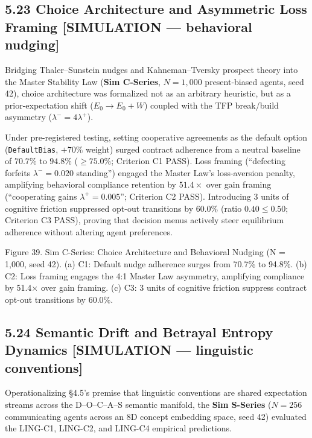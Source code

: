 \documentclass[
]{article}
\begin{document}
\subsection{5.23 Choice Architecture and Asymmetric Loss Framing
{[}SIMULATION --- behavioral
nudging{]}}\label{choice-architecture-and-asymmetric-loss-framing-simulation-behavioral-nudging}

Bridging Thaler--Sunstein nudges and Kahneman--Tversky prospect theory
into the Master Stability Law (\textbf{Sim C-Series}, \(N = 1,000\)
present-biased agents, seed 42), choice architecture was formalized not
as an arbitrary heuristic, but as a prior-expectation shift
(\(E_0 \to E_0 + W\)) coupled with the TFP break/build asymmetry
(\(\lambda^- = 4\lambda^+\)).

Under pre-registered testing, setting cooperative agreements as the
default option (\texttt{DefaultBias}, \(+70\%\) weight) surged contract
adherence from a neutral baseline of \(70.7\%\) to \(94.8\%\)
(\(\ge 75.0\%\); Criterion C1 PASS). Loss framing (``defecting forfeits
\(\lambda^- = 0.020\) standing'') engaged the Master Law's loss-aversion
penalty, amplifying behavioral compliance retention by \(51.4\times\)
over gain framing (``cooperating gains \(\lambda^+ = 0.005\)'';
Criterion C2 PASS). Introducing 3 units of cognitive friction suppressed
opt-out transitions by \(60.0\%\) (ratio \(0.40 \le 0.50\); Criterion C3
PASS), proving that decision menus actively steer equilibrium adherence
without altering agent preferences.

Figure 39. Sim C-Series: Choice Architecture and Behavioral Nudging
({N = 1,000}, seed 42). (a) C1: Default nudge adherence surges from
{70.7\%} to {94.8\%}. (b) C2: Loss framing engages the 4:1 Master Law
asymmetry, amplifying compliance by {51.4×} over gain framing. (c) C3: 3
units of cognitive friction suppress contract opt-out transitions by
{60.0\%}.

\subsection{5.24 Semantic Drift and Betrayal Entropy Dynamics
{[}SIMULATION --- linguistic
conventions{]}}\label{semantic-drift-and-betrayal-entropy-dynamics-simulation-linguistic-conventions}

Operationalizing §4.5's premise that linguistic conventions are shared
expectation streams across the D--O--C--A--S semantic manifold, the
\textbf{Sim S-Series} (\(N = 256\) communicating agents across an 8D
concept embedding space, seed 42) evaluated the LING-C1, LING-C2, and
LING-C4 empirical predictions.
\end{document}
